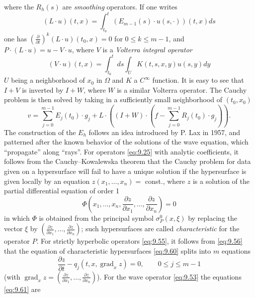 \documentclass[12pt,a4paper,leqno,twoside]{extbook}
\newcommand{\grad}{\operatorname{grad}}
\newcommand{\pder}[2]{\frac{\partial #1}{\partial #2}}
\begin{document}
where the \(R_h(s)\) are \emph{smoothing} operators. If one writes
\[
    (L \cdot u)(t, x) = \int_{t_0}^t \left( E_{m-1}(s) \cdot u(s, \cdot) \right)(t,x) ds
\]
one has \(\left(\pder{}{t}\right)^k (L \cdot u)(t_0, x) = 0\) for \(0 \leq k \leq m-1\), and \(P \cdot (L \cdot u) = u - V \cdot u\), where \(V\) is a \emph{Volterra integral operator}
\begin{equation}
    \label{eq:9.58}
    (V \cdot u)(t, x) = \int_{t_0}^t ds \int_U K(t,s,x,y)u(s,y)dy
\end{equation}
\(U\) being a neighborhood of \(x_0\) in \(\Omega\) and \(K\) a \(C^\infty\) function. It is easy to see that \(I + V\) is inverted by \(I + W\), where \(W\) is a similar Volterra operator. The Cauchy problem is then solved by taking in a sufficiently small neighborhood of \((t_0, x_0)\)
\begin{equation}
    \label{eq:9.59}
    v = \sum_{j=0}^{m-1} E_j(t_0) \cdot g_j + L \cdot \left( (I+W) \cdot \left( f - \sum_{j=0}^{m-1} R_j(t_0) \cdot g_j \right) \right).
\end{equation}
The construction of the \(E_h\) follows an idea introduced by P. Lax in 1957, and patterned after the known behavior of the solutions of the wave equation, which ``propagate'' along ``rays''. For operators \eqref{eq:9.25} with analytic coefficients, it follows from the Cauchy--Kowalewska theorem that the Cauchy problem for data given on a hypersurface will fail to have a unique solution if the hypersurface is given locally by an equation \(z(x_1, \ldots, x_n) =\) const., where \(z\) is a solution of the partial differential equation of order 1
\begin{equation}
    \label{eq:9.60}
    \Phi\left(x_1, \ldots, x_n, \pder{z}{x_1}, \ldots, \pder{z}{x_n}\right) = 0
\end{equation}
in which \(\Phi\) is obtained from the principal symbol \(\sigma^0_P(x, \xi)\) by replacing the vector \(\xi\) by \(\left(\pder{z}{x_1}, \ldots, \pder{z}{x_n}\right)\); such hypersurfaces are called \emph{characteristic} for the operator \(P\). For strictly hyperbolic operators \eqref{eq:9.55}, it follows from \eqref{eq:9.56} that the equation of characteristic hypersurfaces \eqref{eq:9.60} splits into \(m\) equations
\begin{equation}
    \label{eq:9.61}
    \pder{z}{t} - q_j(t, x, \grad_x{z}) = 0, \qquad 0 \leq j \leq m-1
\end{equation}
(with \(\grad_x{z} = \left(\pder{z}{x_1}, \ldots, \pder{z}{x_n}\right)\)). For the wave operator \eqref{eq:9.53} the equations \eqref{eq:9.61} are
\end{document}
